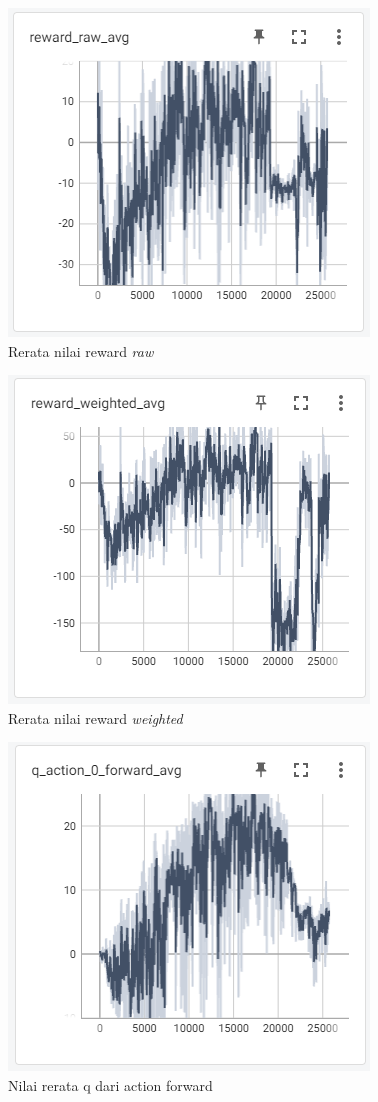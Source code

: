 \documentclass[conference]{IEEEtran}
\begin{document}
	\begin{figure}[H] 
		\centering
		\includegraphics[width=.7\linewidth]{images/reward_raw_avg}
		\caption{Rerata nilai reward \textit{raw}}
		\label{fig:reward_raw_avg}
	\end{figure}
	\begin{figure}[H] 
		\centering
		\includegraphics[width=.7\linewidth]{images/reward_weighted_avg}
		\caption{Rerata nilai reward \textit{weighted}}
		\label{fig:reward_weighted_avg}
	\end{figure}
	\begin{figure}[H] 
		\centering
		\includegraphics[width=.7\linewidth]{images/q_action_0_forward_avg}
		\caption{Nilai rerata q dari action forward}
		\label{fig:q_action_0_forward_avg}
	\end{figure}
\end{document}
